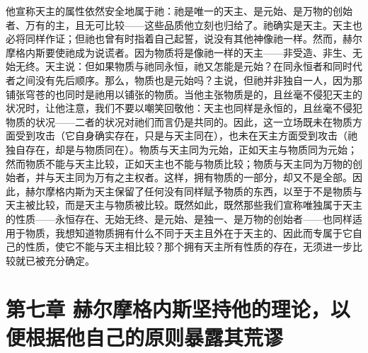 他宣称天主的属性依然安全地属于祂：祂是唯一的天主、是元始、是万物的创始者、万有的主，且无可比较——这些品质他立刻也归给了。祂确实是天主。天主也必将同样作证；但祂也曾有时指着自己起誓，说没有其他神像祂一样。然而，赫尔摩格内斯要使祂成为说谎者。因为物质将是像祂一样的天主——非受造、非生、无始无终。天主说：但如果物质与祂同永恒，祂又怎能是元始？在同永恒者和同时代者之间没有先后顺序。那么，物质也是元始吗？主说，但祂并非独自一人，因为那铺张穹苍的也同时是祂用以铺张的物质。当他主张物质是的，且丝毫不侵犯天主的状况时，让他注意，我们不要以嘲笑回敬他：天主也同样是永恒的，且丝毫不侵犯物质的状况——二者的状况对祂们而言仍是共同的。因此，这一立场既未在物质方面受到攻击（它自身确实存在，只是与天主同在），也未在天主方面受到攻击（祂独自存在，却是与物质同在）。物质与天主同为元始，正如天主与物质同为元始；然而物质不能与天主比较，正如天主也不能与物质比较；物质与天主同为万物的创始者，并与天主同为万有之主权者。这样，拥有物质的一部分，却又不是全部。因此，赫尔摩格内斯为天主保留了任何没有同样赋予物质的东西，以至于不是物质与天主被比较，而是天主与物质被比较。既然如此，既然那些我们宣称唯独属于天主的性质——永恒存在、无始无终、是元始、是独一、是万物的创始者——也同样适用于物质，我想知道物质拥有什么不同于天主且外在于天主的、因此而专属于它自己的性质，使它不能与天主相比较？那个拥有天主所有性质的存在，无须进一步比较就已被充分确定。\par


\section{第七章 赫尔摩格内斯坚持他的理论，以便根据他自己的原则暴露其荒谬}

